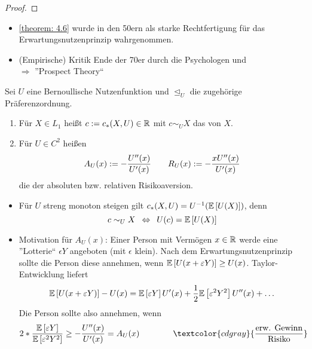 \begin{proof}
\end{proof}

\begin{*bemerkung}
	\begin{itemize}[nolistsep]
		\item \cref{theorem: 4.6} wurde in den 50ern als starke Rechtfertigung für das Erwartungsnutzenprinzip wahrgenommen.
		\item (Empirische) Kritik Ende der 70er durch die Psychologen  und  \\
		$\Rightarrow$ ''Prospect Theory``
	\end{itemize}
\end{*bemerkung}

\begin{*definition}
	Sei $U$ eine Bernoullische Nutzenfunktion und $\unlhd_U$ die zugehörige Präferenzordnung.
	\begin{enumerate}[label=(\alph*)]
		\item Für $X \in L_1$ heißt $c \mathrel{:=} c_\ast(X,U) \in \mathbb{R}$ mit $c \sim_U X$ das  von $X$.
		\item Für $U \in C^2$ heißen
		\begin{equation*}
			A_U(x) \mathrel{:=} - \frac{U''(x)}{U'(x)} \qquad R_U(x) \mathrel{:=} -\frac{x U''(x)}{U'(x)}
		\end{equation*}
		die  der absoluten bzw. relativen Risikoaversion.
	\end{enumerate}
\end{*definition}

\begin{*bemerkung}
	\begin{itemize}
		\item Für $U$ streng monoton steigen gilt $c_\ast(X,U) = U^{-1}(\mathbb{E} \left[ U(X) \right])$, denn
		\begin{equation*}
			c \sim_U X \enskip \Leftrightarrow \enskip U(c) = \mathbb{E} \left[ U(X) \right]
		\end{equation*}
		\item Motivation für $A_U(x)$: Einer Person mit Vermögen $x \in \mathbb{R}$ werde eine ''Lotterie`` $\epsilon Y$ angeboten (mit $\epsilon$ klein). Nach dem Erwartungsnutzenprinzip sollte die Person diese annehmen, wenn $\mathbb{E} \left[ U(x + \varepsilon Y) \right] \ge U(x)$. Taylor-Entwicklung liefert
		\begin{equation*}
			\mathbb{E} \left[ U(x + \varepsilon Y) \right] - U(x) = \mathbb{E} \left[ \varepsilon Y \right] U'(x) + \frac{1}{2} \mathbb{E} \left[ \varepsilon^2 Y^2 \right] U''(x) + \dots
		\end{equation*}
		Die Person sollte also annehmen, wenn 
		\begin{equation*}
			2 * \frac{\EW[\epsilon Y]}{\EW[\epsilon^2 Y^2]} \ge - \frac{U''(x)}{U'(x)} = A_U(x) \qquad\qquad \textcolor{cdgray}{\frac{\text{erw. Gewinn}}{\text{Risiko}}}
		\end{equation*}
	\end{itemize}
\end{*bemerkung}


